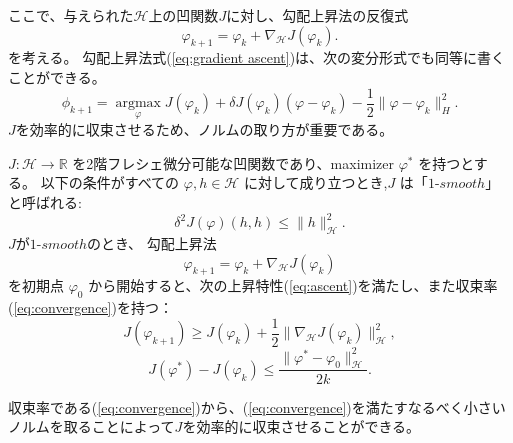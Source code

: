ここで、与えられた$\mathcal{H}$上の凹関数$J$に対し、勾配上昇法の反復式
\begin{equation}
    \label{eq:gradient ascent}
    \varphi_{k+1} = \varphi_k + \nabla_\mathcal{H} J(\varphi_k).
\end{equation}
を考える。
勾配上昇法式(\ref{eq:gradient ascent})は、次の変分形式でも同等に書くことができる。
\begin{equation}
    \label{eq:gradient ascent variational}
    \phi_{k+1} =  \underset{\varphi} {\operatorname{argmax}} J(\varphi_k) + \delta J(\varphi_k)(\varphi-\varphi_k) - \frac{1}{2}\|\varphi-\varphi_k\|_H^2.
\end{equation}
$J$を効率的に収束させるため、ノルムの取り方が重要である。
\begin{thm}
    \label{thm:chose norm}
    $J: \mathcal{H} \rightarrow \mathbb{R}$ を2階フレシェ微分可能な凹関数であり、maximizer $\varphi^*$ を持つとする。
    以下の条件がすべての $\varphi, h \in \mathcal{H}$ に対して成り立つとき,$J$ は「$1$-$smooth$」と呼ばれる:
    \begin{equation}
        \label{eq:1-smooth}
        \delta^2 J(\varphi)(h, h) \leq \|h\|_\mathcal{H}^2.
    \end{equation}
    $J$が$1$-$smooth$のとき、
    勾配上昇法 
    $$
        \varphi_{k+1} = \varphi_k + \nabla_\mathcal{H} J(\varphi_k)
    $$
    を初期点 $\varphi_0$ から開始すると、次の上昇特性(\ref{eq:ascent})を満たし、また収束率(\ref{eq:convergence})を持つ：
    \begin{equation}
        \label{eq:ascent}
        J(\varphi_{k+1}) \geq J(\varphi_k) + \frac{1}{2}\|\nabla_\mathcal{H} J(\varphi_k)\|_\mathcal{H}^2,
    \end{equation}
    \begin{equation}
        \label{eq:convergence}
        J(\varphi^*) - J(\varphi_k) \leq \frac{\|\varphi^* - \varphi_0\|_\mathcal{H}^2}{2k}.
    \end{equation}
\end{thm}
収束率である(\ref{eq:convergence})から、(\ref{eq:convergence})を満たすなるべく小さいノルムを取ることによって$J$を効率的に収束させることができる。




